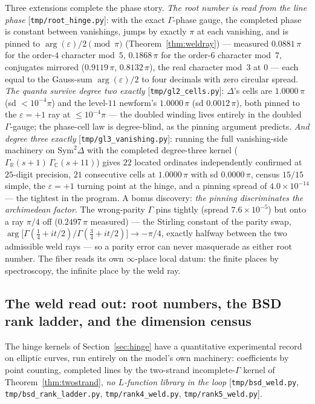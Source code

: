 \documentclass[11pt]{article}
\newcommand{\code}[1]{\texttt{#1}}
\begin{document}
Three extensions complete the phase story.  \emph{The root number is read from the line phase}
[\code{tmp/root\_hinge.py}]: with the exact $\Gamma$-phase gauge, the completed phase is constant
between vanishings, jumps by exactly $\pi$ at each vanishing, and is pinned to
$\arg(\varepsilon)/2\pmod\pi$ (Theorem~\ref{thm:weldray}) --- measured $0.0881\,\pi$ for the
order-$4$ character mod~$5$, $0.1868\,\pi$ for the order-$6$ character mod~$7$, conjugates mirrored
($0.9119\,\pi$, $0.8132\,\pi$), the real character mod~$3$ at $0$ --- each equal to the Gauss-sum
$\arg(\varepsilon)/2$ to four decimals with zero circular spread.  \emph{The quanta survive degree
two exactly} [\code{tmp/gl2\_cells.py}]: $\Delta$'s cells are $1.0000\,\pi$ (sd $<10^{-4}\pi$) and
the level-$11$ newform's $1.0000\,\pi$ (sd $0.0012\,\pi$), both pinned to the $\varepsilon=+1$ ray
at $\le10^{-4}\pi$ --- the doubled winding lives entirely in the doubled $\Gamma$-gauge; the
phase-cell law is degree-blind, as the pinning argument predicts.  \emph{And degree three exactly}
[\code{tmp/gl3\_vanishing.py}]: running the full vanishing-side machinery on $\mathrm{Sym}^2\Delta$
with the completed degree-three kernel ($\Gamma_{\mathbb R}(s{+}1)\,\Gamma_{\mathbb C}(s{+}11)$)
gives $22$ located ordinates independently confirmed at $25$-digit precision, $21$ consecutive
cells at $1.0000\,\pi$ with sd $0.0000\,\pi$, census $15/15$ simple, the $\varepsilon=+1$ turning
point at the hinge, and a pinning spread of $4.0\times10^{-14}$ --- the tightest in the program.
A bonus discovery: \emph{the pinning discriminates the archimedean factor}.  The wrong-parity
$\Gamma$ pins tightly (spread $7.6\times10^{-5}$) but onto a ray $\pi/4$ off ($0.2497\,\pi$
measured) --- the Stirling constant of the parity swap,
$\arg\bigl[\Gamma(\tfrac14+it/2)/\Gamma(\tfrac34+it/2)\bigr]\to-\pi/4$, exactly halfway between
the two admissible weld rays --- so a parity error can never masquerade as either root number.
The fiber reads its own $\infty$-place local datum: the finite places by spectroscopy, the
infinite place by the weld ray.

\subsection{The weld read out: root numbers, the BSD rank ladder, and the dimension census}\label{sub:bsdladder}

The hinge kernels of Section~\ref{sec:hinge} have a quantitative experimental record on elliptic
curves, run entirely on the model's own machinery: coefficients by point counting, completed lines
by the two-strand incomplete-$\Gamma$ kernel of Theorem~\ref{thm:twostrand}, \emph{no $L$-function
library in the loop}
[\code{tmp/bsd\_weld.py}, \code{tmp/bsd\_rank\_ladder.py}, \code{tmp/rank4\_weld.py},
\code{tmp/rank5\_weld.py}].
\end{document}
